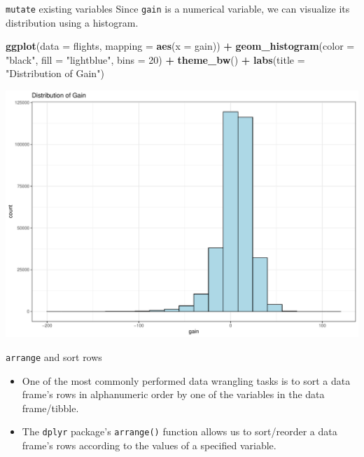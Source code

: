 \documentclass[
  ignorenonframetext,
]{beamer}
\newenvironment{Shaded}{\begin{snugshade}}{\end{snugshade}}
\newcommand{\AttributeTok}[1]{\textcolor[rgb]{0.13,0.29,0.53}{#1}}
\newcommand{\DecValTok}[1]{\textcolor[rgb]{0.00,0.00,0.81}{#1}}
\newcommand{\FunctionTok}[1]{\textcolor[rgb]{0.13,0.29,0.53}{\textbf{#1}}}
\newcommand{\NormalTok}[1]{#1}
\newcommand{\SpecialCharTok}[1]{\textcolor[rgb]{0.81,0.36,0.00}{\textbf{#1}}}
\newcommand{\StringTok}[1]{\textcolor[rgb]{0.31,0.60,0.02}{#1}}
\begin{document}
\begin{frame}[fragile]{\texttt{mutate} existing variables}
\protect\hypertarget{mutate-existing-variables-7}{}
Since \texttt{gain} is a numerical variable, we can visualize its
distribution using a histogram.

\normalsize

\begin{Shaded}
\begin{Highlighting}[]
\FunctionTok{ggplot}\NormalTok{(}\AttributeTok{data =}\NormalTok{ flights, }\AttributeTok{mapping =} \FunctionTok{aes}\NormalTok{(}\AttributeTok{x =}\NormalTok{ gain)) }\SpecialCharTok{+}
  \FunctionTok{geom\_histogram}\NormalTok{(}\AttributeTok{color =} \StringTok{"black"}\NormalTok{, }\AttributeTok{fill =} \StringTok{"lightblue"}\NormalTok{, }
                 \AttributeTok{bins =} \DecValTok{20}\NormalTok{) }\SpecialCharTok{+} 
  \FunctionTok{theme\_bw}\NormalTok{() }\SpecialCharTok{+} 
  \FunctionTok{labs}\NormalTok{(}\AttributeTok{title =} \StringTok{"Distribution of Gain"}\NormalTok{)}
\end{Highlighting}
\end{Shaded}

\begin{center}\includegraphics[width=0.6\linewidth,height=0.45\textheight]{Week3_Lect_files/figure-beamer/unnamed-chunk-27-1} \end{center}
\normalsize
\end{frame}

\begin{frame}[fragile]{\texttt{arrange} and sort rows}
\protect\hypertarget{arrange-and-sort-rows}{}
\begin{itemize}
\item
  One of the most commonly performed data wrangling tasks is to sort a
  data frame's rows in alphanumeric order by one of the variables in the
  data frame/tibble.
\item
  The \texttt{dplyr} package's \texttt{arrange()} function allows us to
  sort/reorder a data frame's rows according to the values of a
  specified variable.
\end{itemize}
\end{frame}
\end{document}
